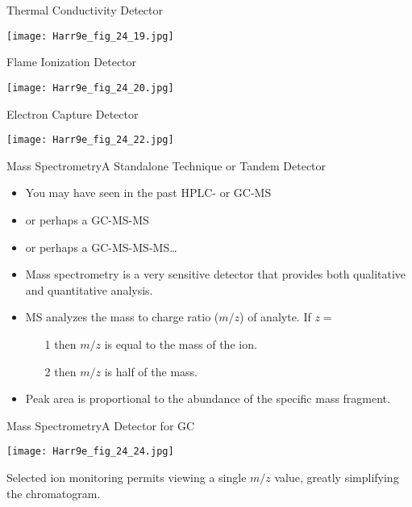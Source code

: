\documentclass[handout]{beamer}
\begin{document}
\begin{frame}{Thermal Conductivity Detector}
	\begin{center}
		\texttt{[image: Harr9e\_fig\_24\_19.jpg]}
	\end{center}
\end{frame}

\begin{frame}{Flame Ionization Detector}
	\begin{center}
		\texttt{[image: Harr9e\_fig\_24\_20.jpg]}
	\end{center}
\end{frame}

\begin{frame}{Electron Capture Detector}
	\begin{center}
		\texttt{[image: Harr9e\_fig\_24\_22.jpg]}
	\end{center}
\end{frame}

\begin{frame}{Mass Spectrometry}{A Standalone Technique or \alert{Tandem}
	Detector}
	\begin{itemize}
		\item You may have seen in the past HPLC- or GC-MS
		\item or perhaps a GC-MS-MS
		\item or perhaps a GC-MS-MS-MS\ldots
		\item \alert{Mass spectrometry} is a very sensitive detector
			that provides both \alert{qualitative} and
			\alert{quantitative} analysis.
		\item MS analyzes the mass to charge ratio ($m/z$) of analyte.
			If $z =$
			\begin{itemize}
				\item[1] then $m/z$ is equal to the mass of the
					ion.
				\item[2] then $m/z$ is half of the mass.
			\end{itemize}
		\item Peak area is proportional to the abundance of the specific
			\alert{mass fragment}.
	\end{itemize}
\end{frame}

\begin{frame}{Mass Spectrometry}{A Detector for GC}
	\begin{center}
		\texttt{[image: Harr9e\_fig\_24\_24.jpg]}
	\end{center}

	Selected ion monitoring permits viewing a \alert{single} $m/z$ value,
	greatly simplifying the chromatogram.
\end{frame}
\end{document}
